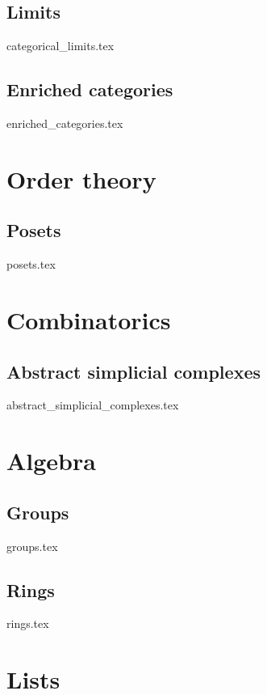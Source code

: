\documentclass[numbers=endperiod, bibliography=totocnumbered]{scrartcl}
\begin{document}
\subsection{Limits}\label{sec:categorical_limits}
{categorical_limits.tex}
\subsection{Enriched categories}\label{sec:enriched_categories}
{enriched_categories.tex}

\section{Order theory}\label{sec:order_theory}
\subsection{Posets}\label{sec:posets}
{posets.tex}

\section{Combinatorics}\label{sec:combinatorics}
\subsection{Abstract simplicial complexes}\label{sec:abstract_simplicial_complexes}
{abstract_simplicial_complexes.tex}

\section{Algebra}\label{sec:algebra}
\subsection{Groups}\label{sec:groups}
{groups.tex}
\subsection{Rings}\label{sec:rings}
{rings.tex}

\section{Lists}

\listofaoc\label{list:aoc}
\listoflem\label{list:lem}
\listofusc\label{list:usc}

\printbibliography
\end{document}
